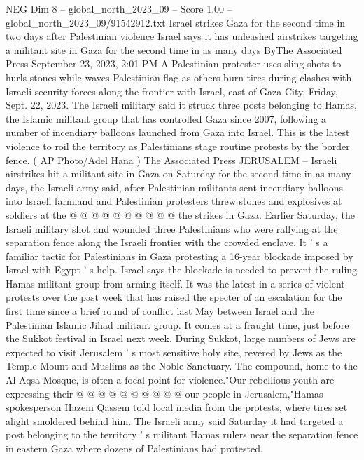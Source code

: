 \begin{textsample}{NEG Dim 8 – global\_north\_2023\_09 – Score 1.00 – global\_north\_2023\_09/91542912.txt}  \label{ex:f8_neg_327}
Israel strikes Gaza for the second time in two days after Palestinian violence Israel says it has unleashed airstrikes targeting a militant site in Gaza for the second time in as many days ByThe Associated Press September 23, 2023, 2:01 PM A Palestinian protester uses sling shots to hurls stones while waves Palestinian flag as others burn tires during clashes with Israeli security forces along the frontier with Israel, east of Gaza City, Friday, Sept. 22, 2023.
The Israeli military said it struck three posts belonging to Hamas, the Islamic militant group that has controlled Gaza since 2007, following a number of incendiary balloons launched from Gaza into Israel.
This is the latest violence to roil the territory as Palestinians stage routine protests by the border fence. ( AP Photo/Adel Hana ) The Associated Press JERUSALEM -- Israeli airstrikes hit a militant site in Gaza on Saturday for the second time in as many days, the Israeli army said, after Palestinian militants sent incendiary balloons into Israeli farmland and Palestinian protesters threw stones and explosives at soldiers at the @ @ @ @ @ @ @ @ @ @ the strikes in Gaza.
Earlier Saturday, the Israeli military shot and wounded three Palestinians who were rallying at the separation fence along the Israeli frontier with the crowded enclave.
It ' s a familiar tactic for Palestinians in Gaza protesting a 16-year blockade imposed by Israel with Egypt ' s help.
Israel says the blockade is needed to prevent the ruling Hamas militant group from arming itself.
It was the latest in a series of violent protests over the past week that has raised the specter of an escalation for the first time since a brief round of conflict last May between Israel and the Palestinian Islamic Jihad militant group.
It comes at a fraught time, just before the Sukkot festival in Israel next week.
During Sukkot, large numbers of Jews are expected to visit Jerusalem ' s most sensitive holy site, revered by Jews as the Temple Mount and Muslims as the Noble Sanctuary.
The compound, home to the Al-Aqsa Mosque, is often a focal point for violence."Our rebellious youth are expressing their @ @ @ @ @ @ @ @ @ @ our people in Jerusalem,"Hamas spokesperson Hazem Qassem told local media from the protests, where tires set alight smoldered behind him.
The Israeli army said Saturday it had targeted a post belonging to the territory ' s militant Hamas rulers near the separation fence in eastern Gaza where dozens of Palestinians had protested.

\end{textsample}
